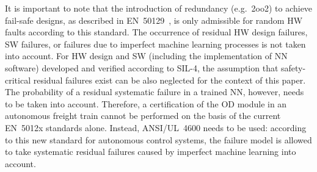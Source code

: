 \documentclass[runningheads,a4paper]{llncs}
\begin{document}
It is important to note that the introduction of redundancy (e.g.~2oo2) to achieve fail-safe designs, as described in EN~50129~\cite[B.3.1]{CENELEC50129}, is only admissible for random HW faults according to this standard. The occurrence of residual HW design failures, SW failures, or failures due to imperfect machine learning processes is not taken into account. For HW design and SW (including the implementation of NN software) developed and verified according to SIL-4, the assumption that safety-critical residual failures exist can be also neglected for the context of this paper. The probability of a residual systematic failure in a trained NN, however, needs to be taken into account. Therefore, a certification of 
the OD module in an autonomous freight train cannot be performed on the basis of the current EN~5012x standards alone. Instead, ANSI/UL~4600\xspace needs to be used: according to this new standard for autonomous control systems, the failure model is allowed to take systematic residual failures caused by imperfect machine learning into account. 

 



\end{document}

